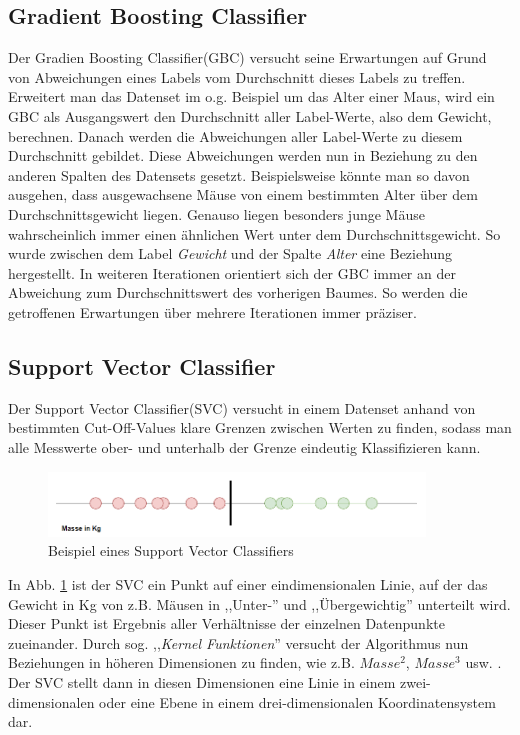 \subsection{Gradient Boosting Classifier}
Der Gradien Boosting Classifier(GBC) versucht seine Erwartungen auf Grund von Abweichungen eines Labels vom 
Durchschnitt dieses Labels zu treffen. Erweitert man das Datenset im o.g. Beispiel um das Alter einer Maus, wird 
ein GBC als Ausgangswert den Durchschnitt aller Label-Werte, also dem Gewicht, berechnen. Danach werden die 
Abweichungen aller Label-Werte zu diesem Durchschnitt gebildet. Diese Abweichungen werden nun in Beziehung zu den 
anderen Spalten des Datensets gesetzt. Beispielsweise könnte man so davon ausgehen, dass ausgewachsene Mäuse von einem 
bestimmten Alter über dem Durchschnittsgewicht liegen. Genauso liegen besonders junge Mäuse wahrscheinlich immer
einen ähnlichen Wert unter dem Durchschnittsgewicht. So wurde zwischen dem Label \textit{Gewicht} und der Spalte 
\textit{Alter} eine Beziehung hergestellt. In weiteren Iterationen orientiert sich der GBC immer an der Abweichung 
zum Durchschnittswert des vorherigen Baumes. So werden die getroffenen Erwartungen über mehrere Iterationen immer 
präziser.

\subsection{Support Vector Classifier}
Der Support Vector Classifier(SVC) versucht in einem Datenset anhand von bestimmten Cut-Off-Values klare Grenzen 
zwischen Werten zu finden, sodass man alle Messwerte ober- und unterhalb der Grenze eindeutig Klassifizieren 
kann.

\begin{figure}[h]
    \centering
    \includegraphics[width=10.0cm]{pic/SVC_1D.png}
    \caption{Beispiel eines Support Vector Classifiers}
    \label{fig:SVC_1D}
\end{figure}

In Abb. \ref{fig:SVC_1D} ist der SVC ein Punkt auf einer eindimensionalen Linie, auf der das Gewicht in Kg von z.B. 
Mäusen in ,,Unter-'' und ,,Übergewichtig'' unterteilt wird. Dieser Punkt ist Ergebnis aller Verhältnisse der einzelnen
Datenpunkte zueinander. Durch sog. ,,\textit{Kernel Funktionen}'' versucht der Algorithmus nun Beziehungen 
in höheren Dimensionen zu finden, wie z.B. $Masse^2$, $Masse^3$ usw. . Der SVC stellt dann in diesen Dimensionen 
eine Linie in einem zwei-dimensionalen oder eine Ebene in einem drei-dimensionalen Koordinatensystem dar.\\

